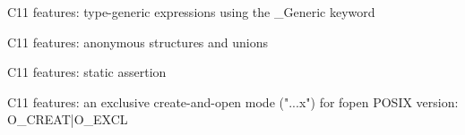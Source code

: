 \begin{frame}{C11 features: type-generic expressions using the \_Generic keyword}
    
\end{frame}
\begin{frame}{C11 features: anonymous structures and unions}
    
\end{frame}
\begin{frame}{C11 features: static assertion}
\end{frame}
\begin{frame}{C11 features: an exclusive create-and-open mode ("...x") for fopen}
    POSIX version: O\_CREAT|O\_EXCL
    
\end{frame}
